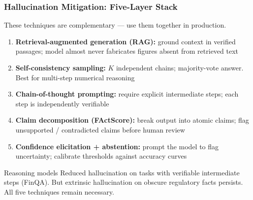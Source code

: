 \documentclass[9pt,t]{beamer}
\begin{document}
\begin{frame}
\frametitle{Hallucination Mitigation: Five-Layer Stack}

These techniques are complementary --- use them together in production.

\medskip
\begin{enumerate}
  \item \textbf{Retrieval-augmented generation (RAG):} ground context in verified
        passages; model almost never fabricates figures absent from retrieved text
  \item \textbf{Self-consistency sampling:} $K$ independent chains; majority-vote
        answer. Best for multi-step numerical reasoning
  \item \textbf{Chain-of-thought prompting:} require explicit intermediate steps;
        each step is independently verifiable
  \item \textbf{Claim decomposition (FActScore):} break output into atomic claims;
        flag unsupported / contradicted claims before human review
  \item \textbf{Confidence elicitation + abstention:} prompt the model to flag
        uncertainty; calibrate thresholds against accuracy curves
\end{enumerate}

\medskip
\begin{alertblock}{Reasoning models}
Reduced hallucination on tasks with verifiable intermediate steps (FinQA).
But extrinsic hallucination on obscure regulatory facts persists.
All five techniques remain necessary.
\end{alertblock}
\end{frame}
\end{document}

